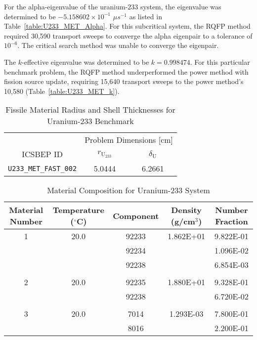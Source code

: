 For the alpha-eigenvalue of the uranium-233 system, the eigenvalue was determined to be $-5.158602 \times 10^{-1}$ $\mu s^{-1}$ as listed in Table~\ref{table:U233_MET_Alpha}. For this subcritical system, the RQFP method required 30,590 transport sweeps to converge the alpha eigenpair to a tolerance of $10^{-6}$. The critical search method was unable to converge the eigenpair.

The $k$-effective eigenvalue was determined to be $k = 0.998474$. For this particular benchmark problem, the RQFP method underperformed the power method with fission source update, requiring 15,640 transport sweeps to the power method's 10,580 (Table~\ref{table:U233_MET_k}).

\begin{table}[!htbp]
	\centering{}
	\begin{tabular}{@{}ccc@{}}\toprule
	& \multicolumn{2}{c}{Problem Dimensions [cm]} \\
	\cmidrule{2-3} ICSBEP ID & $r_{\text{U$_{233}$}}$ & $\delta_{\text{U}}$ \\
	\midrule
	\texttt{U233\_MET\_FAST\_002} & 5.0444 & 6.2661 \\
	\bottomrule
	\end{tabular}
	\caption{Fissile Material Radius and Shell Thicknesses for Uranium-233 Benchmark}
	\label{table:U233_MET_Dims}
\end{table}

\begin{table}[!htbp]
	\caption{Material Composition for Uranium-233 System}
	\label{table:U233}
		\centering{}
		\begin{tabular}{@{}ccccc@{}}\toprule
			Material Number & Temperature ($^{\circ}$C) & Component & Density (g/cm$^{3}$) & Number Fraction \\ 
        			\midrule
         1  &  20.0 &    92233  &       1.862E+01  & 9.822E-01 \\
            & &          92234      &     &          1.096E-02 \\
           & &            92238     &     &           6.854E-03 \\
	& & & & \\
         2    & 20.0 &    92235   &      1.880E+01  & 9.328E-01 \\
        & &               92238     &  &              6.720E-02 \\
	& & & & \\
         3   & 20.0  &  7014  &        1.293E-03  & 7.800E-01 \\
          & &              8016   & &                2.200E-01 \\
		\bottomrule
		\end{tabular}
\end{table}

